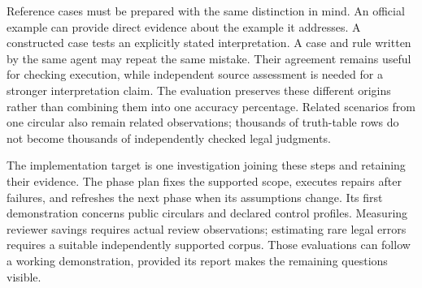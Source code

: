 Reference cases must be prepared with the same distinction in mind. An official
example can provide direct evidence about the example it addresses. A constructed
case tests an explicitly stated interpretation. A case and rule written by the
same agent may repeat the same mistake. Their agreement remains useful for
checking execution, while independent source assessment is needed for a stronger
interpretation claim. The evaluation preserves these different origins rather
than combining them into one accuracy percentage. Related scenarios from one
circular also remain related observations; thousands of truth-table rows do not
become thousands of independently checked legal judgments.

The implementation target is one investigation joining these steps and retaining
their evidence. The phase plan fixes the supported scope, executes repairs after
failures, and refreshes the next phase when its assumptions change. Its first
demonstration concerns public circulars and declared control profiles. Measuring
reviewer savings requires actual review observations; estimating rare legal
errors requires a suitable independently supported corpus. Those evaluations
can follow a working demonstration, provided its report makes the remaining
questions visible.
